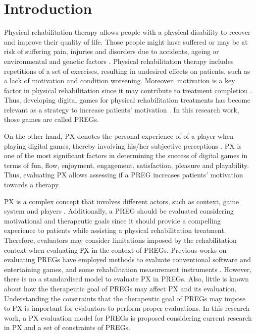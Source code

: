 \chapter{Introduction} %
\label{ch:intro}

Physical rehabilitation therapy allows people with a physical disability to recover and improve their quality of life. Those people might have suffered or may be at risk of suffering pain, injuries and disorders due to accidents, ageing or environmental and genetic factors \autocite{american2011today}. Physical rehabilitation therapy includes repetitions of a set of exercises, resulting in undesired effects on patients, such as a lack of motivation and condition worsening. Moreover, motivation is a key factor in physical rehabilitation since it may contribute to treatment completion \autocite{Shelton2015}. Thus, developing digital games for physical rehabilitation treatments has become relevant as a strategy to increase patients' motivation \autocite{Brokaw2015,Burke2009,Hernandez2013,McNeill2012,PirovanoAdvisor2012}. In this research work, those games are called \acp{PREG}.

On the other hand, \ac{PX} denotes the personal experience of of a player when playing digital games, thereby involving his/her subjective perceptions \autocite{Chu2011,Wiemeyer2016}. \ac{PX} is one of the most significant factors in determining the success of digital games in terms of fun, flow, enjoyment, engagement, satisfaction, pleasure and playability. Thus, evaluating \ac{PX} allows assessing if a \ac{PREG} increases patients’ motivation towards a therapy. 

\ac{PX} is a complex concept that involves different actors, such as context, game system and players \autocite{Engl2013,Fernandez2008,Nackea2}. Additionally, a \ac{PREG} should be evaluated considering motivational and therapeutic goals since it should provide a compelling experience to patients while assisting a physical rehabilitation treatment. Therefore, evaluators may consider limitations imposed by the rehabilitation context when evaluating \c{PX} in the context of \acp{PREG}. Previous works on evaluating \acp{PREG} have employed methods to evaluate conventional software and entertaining games, and some rehabilitation measurement instruments \autocite{Brokaw2015,Burke2009,jansen2013serious,Ni2014,Seo2016,Wuest2014}. However, there is no a standardised model to evaluate \ac{PX} in \acp{PREG}. Also, little is known about how the therapeutic goal of \acp{PREG} may affect \ac{PX} and its evaluation. Understanding the constraints that the therapeutic goal of \acp{PREG} may impose to \ac{PX} is important for evaluators to perform proper evaluations. In this research work, a \ac{PX} evaluation model for \acp{PREG} is proposed considering current research in \ac{PX} and a set of constraints of \acp{PREG}.


